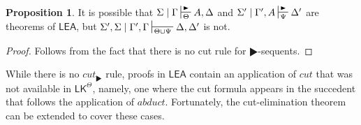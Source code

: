 \documentclass{article}
\theoremstyle{definition}
\theoremstyle{definition}
\theoremstyle{definition}
\theoremstyle{definition}
\theoremstyle{remark}
\theoremstyle{definition}
\newtheorem{proposition}{Proposition}
\theoremstyle{definition}
\begin{document}
\begin{proposition}\label{nontrans}
	It is possible that $ \Sigma\mid\Gamma\sststile{\Theta}{\RHD} A, \Delta $ and $ \Sigma'\mid\Gamma', A\sststile{\Psi}{\RHD} \Delta' $ are theorems of $ \mathsf{LEA}$, but $ \Sigma',\Sigma\mid\Gamma',\Gamma\sststile{\Theta\cup\Psi}{}\Delta,\Delta' $ is not.
	
	\begin{proof}
		Follows from the fact that there is no cut rule for $ \RHD$-sequents.
	\end{proof}
	
\end{proposition}


While there is no $ cut_\RHD$ rule, proofs in $ \mathsf{LEA}$ contain an application of $cut $ that was not available in $\mathsf{LK}^\Theta$, namely, one where the cut formula appears in the succedent that follows the application of $ abduct $.  Fortunately, the cut-elimination theorem can be extended to cover these cases.
\end{document}
